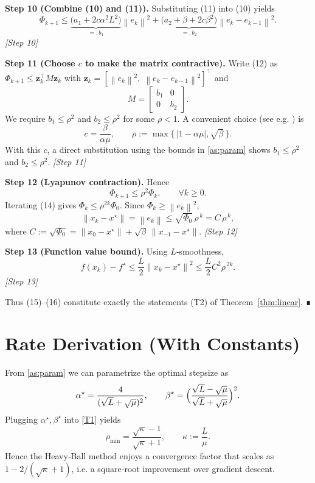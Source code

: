 \documentclass{article}
\newcommand{\norm}[1]{\left\lVert#1\right\rVert}
\begin{document}
\bigskip
\noindent\textbf{Step 10 (Combine (10) and (11)).}
Substituting (11) into (10) yields
\[
\Phi_{k+1}\le
\underbrace{\bigl(a_{1}+2c\alpha^{2}L^{2}\bigr)}_{=:b_{1}}\norm{e_{k}}^{2}
+
\underbrace{\bigl(a_{2}+\beta+2c\beta^{2}\bigr)}_{=:b_{2}}\norm{e_{k}-e_{k-1}}^{2}.
\tag{12}
\]
\textit{[Step 10]}

\bigskip
\noindent\textbf{Step 11 (Choose $c$ to make the matrix contractive).}
Write (12) as $\Phi_{k+1}\le \mathbf{z}_{k}^{\!\top}M\mathbf{z}_{k}$ with
$\mathbf{z}_{k}=[\norm{e_{k}}^{2},\;\norm{e_{k}-e_{k-1}}^{2}]^{\top}$ and
\[
M=
\begin{bmatrix}
b_{1} & 0\\
0   & b_{2}
\end{bmatrix}.
\]
We require $b_{1}\le\rho^{2}$ and $b_{2}\le\rho^{2}$ for some $\rho<1$.
A convenient choice (see e.g. \cite{Polyak1964}) is
\[
c=\frac{\beta}{\alpha\mu},\qquad
\rho:=\max\{\,|1-\alpha\mu|,\sqrt{\beta}\,\}.
\tag{13}
\]
With this $c$, a direct substitution using the bounds in \eqref{as:param}
shows $b_{1}\le\rho^{2}$ and $b_{2}\le\rho^{2}$.
\textit{[Step 11]}

\bigskip
\noindent\textbf{Step 12 (Lyapunov contraction).}
Hence
\[
\Phi_{k+1}\le\rho^{2}\Phi_{k},\qquad\forall k\ge0.
\tag{14}
\]
Iterating (14) gives $\Phi_{k}\le\rho^{2k}\Phi_{0}$.
Since $\Phi_{k}\ge\norm{e_{k}}^{2}$,
\[
\norm{x_{k}-x^{\star}}=\norm{e_{k}}\le\sqrt{\Phi_{0}}\,\rho^{\,k}
= C\,\rho^{\,k},
\tag{15}
\]
where $C:=\sqrt{\Phi_{0}}=\norm{x_{0}-x^{\star}}+\sqrt{\beta}\,\norm{x_{-1}-x^{\star}}$.
\textit{[Step 12]}

\bigskip
\noindent\textbf{Step 13 (Function value bound).}
Using $L$‑smoothness,
\[
f(x_{k})-f^{\star}\le\frac{L}{2}\norm{x_{k}-x^{\star}}^{2}
\le\frac{L}{2}C^{2}\rho^{\,2k}.
\tag{16}
\]
\textit{[Step 13]}

\bigskip
Thus (15)–(16) constitute exactly the statements (T2) of
Theorem~\ref{thm:linear}.  ∎

\section*{Rate Derivation (With Constants)}
From \eqref{as:param} we can parametrize the optimal stepsize as
\[
\alpha^{\star}= \frac{4}{(\sqrt{L}+\sqrt{\mu})^{2}}, \qquad
\beta^{\star}= \Bigl(\frac{\sqrt{L}-\sqrt{\mu}}{\sqrt{L}+\sqrt{\mu}}\Bigr)^{2}.
\]
Plugging $\alpha^{\star},\beta^{\star}$ into \eqref{T1} yields
\[
\rho_{\min}= \frac{\sqrt{\kappa}-1}{\sqrt{\kappa}+1},
\qquad \kappa:=\frac{L}{\mu}.
\]
Hence the Heavy‑Ball method enjoys a convergence factor that scales as
$1-2/(\sqrt{\kappa}+1)$, i.e. a square‑root improvement over gradient descent.
\end{document}
